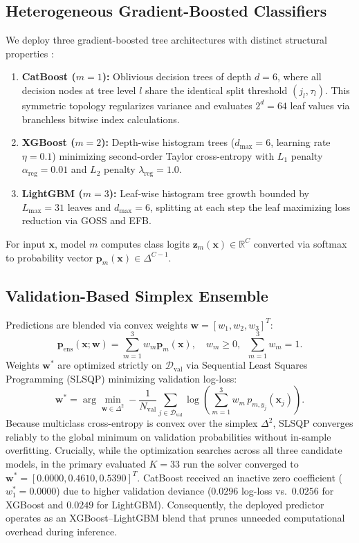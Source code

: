 \documentclass[10pt,journal,twocolumn]{IEEEtran}
\begin{document}
\subsection{Heterogeneous Gradient-Boosted Classifiers}
We deploy three gradient-boosted tree architectures with distinct structural properties \cite{ref9,ref11,ref29}:
\begin{enumerate}
    \item \textbf{CatBoost ($m=1$):} Oblivious decision trees of depth $d=6$, where all decision nodes at tree level $l$ share the identical split threshold $(j_l, \tau_l)$. This symmetric topology regularizes variance and evaluates $2^d = 64$ leaf values via branchless bitwise index calculations.
    \item \textbf{XGBoost ($m=2$):} Depth-wise histogram trees ($d_{\max}=6$, learning rate $\eta=0.1$) minimizing second-order Taylor cross-entropy with $L_1$ penalty $\alpha_{\text{reg}}=0.01$ and $L_2$ penalty $\lambda_{\text{reg}}=1.0$.
    \item \textbf{LightGBM ($m=3$):} Leaf-wise histogram tree growth bounded by $L_{\max}=31$ leaves and $d_{\max}=6$, splitting at each step the leaf maximizing loss reduction via GOSS and EFB.
\end{enumerate}
For input $\mathbf{x}$, model $m$ computes class logits $\mathbf{z}_m(\mathbf{x}) \in \mathbb{R}^C$ converted via softmax to probability vector $\mathbf{p}_m(\mathbf{x}) \in \Delta^{C-1}$.

\subsection{Validation-Based Simplex Ensemble}
Predictions are blended via convex weights $\mathbf{w} = [w_1, w_2, w_3]^T$:
\begin{equation}
\mathbf{p}_{\text{ens}}(\mathbf{x}; \mathbf{w}) = \sum_{m=1}^{3} w_m \mathbf{p}_m(\mathbf{x}), \quad w_m \ge 0, \;\; \sum_{m=1}^{3} w_m = 1.
\label{eq:simplex_blend}
\end{equation}
Weights $\mathbf{w}^*$ are optimized strictly on $\mathcal{D}_{\text{val}}$ via Sequential Least Squares Programming (SLSQP) minimizing validation log-loss:
\begin{equation}
\mathbf{w}^* = \arg\min_{\mathbf{w} \in \Delta^2} -\frac{1}{N_{\text{val}}} \sum_{j \in \mathcal{D}_{\text{val}}} \log\left(\sum_{m=1}^{3} w_m \, p_{m, y_j}(\mathbf{x}_j)\right).
\end{equation}
Because multiclass cross-entropy is convex over the simplex $\Delta^2$, SLSQP converges reliably to the global minimum on validation probabilities without in-sample overfitting. Crucially, while the optimization searches across all three candidate models, in the primary evaluated $K=33$ run the solver converged to $\mathbf{w}^* = [0.0000, 0.4610, 0.5390]^T$. CatBoost received an inactive zero coefficient ($w_1^* = 0.0000$) due to higher validation deviance ($0.0296$ log-loss vs.\ $0.0256$ for XGBoost and $0.0249$ for LightGBM). Consequently, the deployed predictor operates as an XGBoost--LightGBM blend that prunes unneeded computational overhead during inference.
\end{document}
